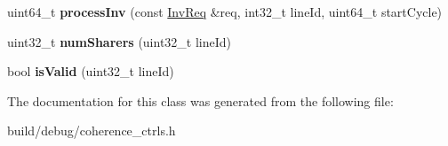 \begin{DoxyCompactItemize}
\item 
\hypertarget{classMESITerminalCC_a08ccd1bd159752c51a17f77a8a21d493}{uint64\-\_\-t {\bfseries process\-Inv} (const \hyperlink{structInvReq}{Inv\-Req} \&req, int32\-\_\-t line\-Id, uint64\-\_\-t start\-Cycle)}\label{classMESITerminalCC_a08ccd1bd159752c51a17f77a8a21d493}

\item 
\hypertarget{classMESITerminalCC_a4ef3939c2efc0847d3b4329d48b6f2d4}{uint32\-\_\-t {\bfseries num\-Sharers} (uint32\-\_\-t line\-Id)}\label{classMESITerminalCC_a4ef3939c2efc0847d3b4329d48b6f2d4}

\item 
\hypertarget{classMESITerminalCC_af790a8b2ff504692b53f907bc24b9cc1}{bool {\bfseries is\-Valid} (uint32\-\_\-t line\-Id)}\label{classMESITerminalCC_af790a8b2ff504692b53f907bc24b9cc1}

\end{DoxyCompactItemize}


The documentation for this class was generated from the following file\-:\begin{DoxyCompactItemize}
\item 
build/debug/coherence\-\_\-ctrls.\-h\end{DoxyCompactItemize}
